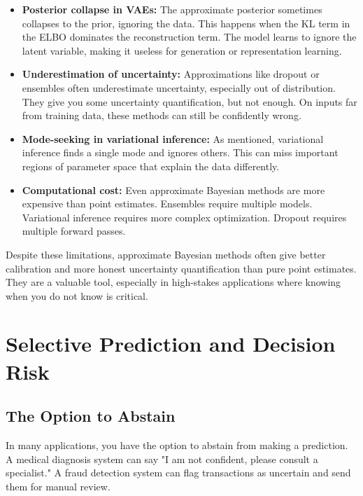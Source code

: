 \begin{itemize}
\item \textbf{Posterior collapse in VAEs:} The approximate posterior sometimes collapses to the prior, ignoring the data. This happens when the KL term in the ELBO dominates the reconstruction term. The model learns to ignore the latent variable, making it useless for generation or representation learning.

\item \textbf{Underestimation of uncertainty:} Approximations like dropout or ensembles often underestimate uncertainty, especially out of distribution. They give you some uncertainty quantification, but not enough. On inputs far from training data, these methods can still be confidently wrong.

\item \textbf{Mode-seeking in variational inference:} As mentioned, variational inference finds a single mode and ignores others. This can miss important regions of parameter space that explain the data differently.

\item \textbf{Computational cost:} Even approximate Bayesian methods are more expensive than point estimates. Ensembles require multiple models. Variational inference requires more complex optimization. Dropout requires multiple forward passes.
\end{itemize}

Despite these limitations, approximate Bayesian methods often give better calibration and more honest uncertainty quantification than pure point estimates. They are a valuable tool, especially in high-stakes applications where knowing when you do not know is critical.

\vspace{2em}

\section{Selective Prediction and Decision Risk}

\subsection{The Option to Abstain}

In many applications, you have the option to abstain from making a prediction. A medical diagnosis system can say "I am not confident, please consult a specialist." A fraud detection system can flag transactions as uncertain and send them for manual review.

